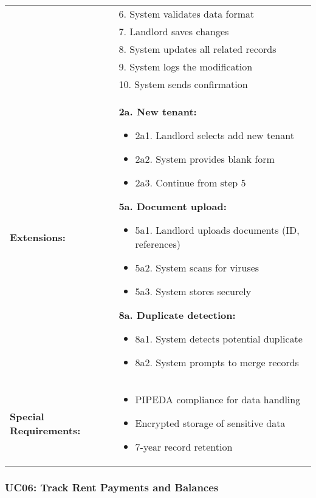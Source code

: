 \documentclass[12pt]{article}
\begin{document}
\begin{longtable}{|p{3cm}|p{11cm}|}
& 6. System validates data format \\
& 7. Landlord saves changes \\
& 8. System updates all related records \\
& 9. System logs the modification \\
& 10. System sends confirmation \\
\hline
\textbf{Extensions:} & 
\textbf{2a. New tenant:}
\begin{itemize}
    \item 2a1. Landlord selects add new tenant
    \item 2a2. System provides blank form
    \item 2a3. Continue from step 5
\end{itemize}
\textbf{5a. Document upload:}
\begin{itemize}
    \item 5a1. Landlord uploads documents (ID, references)
    \item 5a2. System scans for viruses
    \item 5a3. System stores securely
\end{itemize}
\textbf{8a. Duplicate detection:}
\begin{itemize}
    \item 8a1. System detects potential duplicate
    \item 8a2. System prompts to merge records
\end{itemize} \\
\hline
\textbf{Special Requirements:} & 
\begin{itemize}
    \item PIPEDA compliance for data handling
    \item Encrypted storage of sensitive data
    \item 7-year record retention
\end{itemize} \\
\hline
\end{longtable}


\subsubsection{UC06: Track Rent Payments and Balances}
\end{document}
